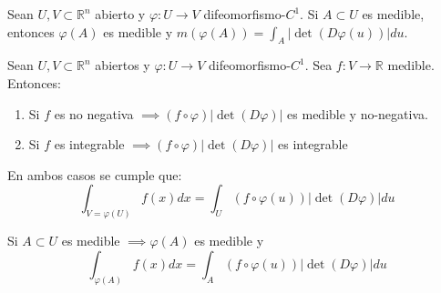 \begin{teorema}
    Sean $U, V \subset \mathbb{R}^n$ abierto y $\varphi: U \to V$ difeomorfismo-$C^{1}$. Si $A \subset U$ es medible, entonces $\varphi(A)$ es medible y $m(\varphi(A)) = \int_{A}|\det(D\varphi(u))|du$.
\end{teorema}

\begin{teorema}
    Sean $U,V \subset \mathbb{R}^n$ abiertos y $\varphi: U \to V$ difeomorfismo-$C^1$. Sea $f: V \to \mathbb{R}$ medible. Entonces:
    \begin{enumerate}
        \item Si $f$ es no negativa $\implies (f \circ \varphi) |\det(D\varphi)|$ es medible
              y no-negativa.
        \item Si $f$ es integrable $\implies (f \circ \varphi)|\det(D\varphi)|$ es integrable \end{enumerate}
    En ambos casos se cumple que:
    $$\int_{V = \varphi(U)} f(x)dx = \int_U (f \circ \varphi(u))|\det(D\varphi)|du$$
\end{teorema}
\begin{observación}
Si $A \subset U$ es medible $\implies \varphi(A)$ es medible y
$$\int_{\varphi(A)}f(x)dx = \int_{A}(f \circ \varphi(u))|\det(D\varphi)|du$$
\end{observación}

